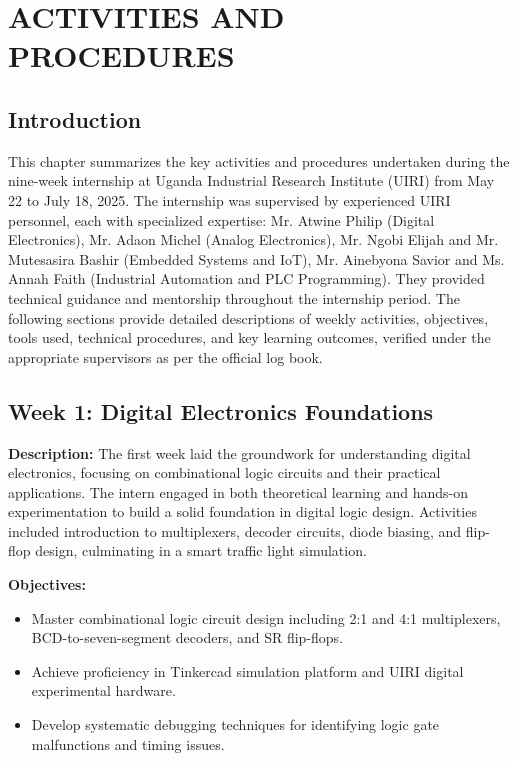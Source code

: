 \documentclass[12pt,a4paper]{report}
\begin{document}
\chapter{ACTIVITIES AND PROCEDURES}

\section{Introduction}

This chapter summarizes the key activities and procedures undertaken during the nine-week internship at Uganda Industrial Research Institute (UIRI) from May 22 to July 18, 2025. The internship was supervised by experienced UIRI personnel, each with specialized expertise: Mr. Atwine Philip (Digital Electronics), Mr. Adaon Michel (Analog Electronics), Mr. Ngobi Elijah and Mr. Mutesasira Bashir (Embedded Systems and IoT), Mr. Ainebyona Savior and Ms. Annah Faith (Industrial Automation and PLC Programming). They provided technical guidance and mentorship throughout the internship period. The following sections provide detailed descriptions of weekly activities, objectives, tools used, technical procedures, and key learning outcomes, verified under the appropriate supervisors as per the official log book.

\section{Week 1: Digital Electronics Foundations}

\textbf{Description:} The first week laid the groundwork for understanding digital electronics, focusing on combinational logic circuits and their practical applications. The intern engaged in both theoretical learning and hands-on experimentation to build a solid foundation in digital logic design. Activities included introduction to multiplexers, decoder circuits, diode biasing, and flip-flop design, culminating in a smart traffic light simulation.

\textbf{Objectives:}
\begin{itemize}
    \item Master combinational logic circuit design including 2:1 and 4:1 multiplexers, BCD-to-seven-segment decoders, and SR flip-flops.
    \item Achieve proficiency in Tinkercad simulation platform and UIRI digital experimental hardware.
    \item Develop systematic debugging techniques for identifying logic gate malfunctions and timing issues.
\end{itemize}
\end{document}
